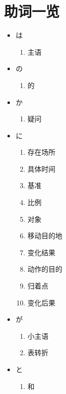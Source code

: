 
\usepackage{../../lectures_preamble}


    \section{助词一览}
    \begin{itemize}
        \item は
            \begin{enumerate}
                \item 主语
            \end{enumerate}
        \item の
            \begin{enumerate}
                \item 的
            \end{enumerate}
        \item か
            \begin{enumerate}
                \item 疑问
            \end{enumerate}
        \item に
            \begin{enumerate}
                \item 存在场所
                \item 具体时间
                \item 基准
                \item 比例
                \item 对象
                \item 移动目的地
                \item 变化结果
                \item 动作的目的
                \item 归着点
                \item 变化后果
            \end{enumerate}
        \item が
            \begin{enumerate}
                \item 小主语
                \item 表转折
            \end{enumerate}
        \item と
            \begin{enumerate}
                \item 和

\end{enumerate}
\end{itemize}
